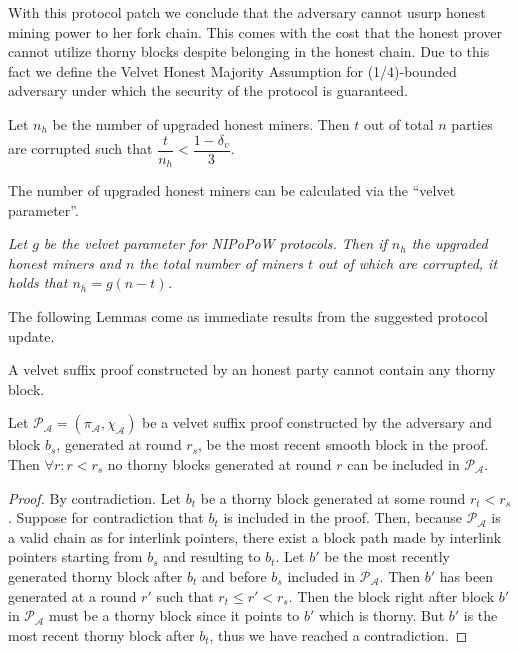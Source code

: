 With this protocol patch we conclude that the adversary cannot usurp honest mining power to her fork chain. This comes with the cost that the honest prover cannot utilize thorny blocks despite belonging in the honest chain. Due to this fact we define the Velvet Honest Majority Assumption for (1/4)-bounded adversary under which the security of the protocol is guaranteed.

\begin{definition}
	Let $n_h$ be the number of upgraded honest miners. Then $t$ out of total $n$ parties are corrupted such that $\dfrac{t}{n_h} < \dfrac{1 - \delta_v}{3} $.
	\label{defn:velvet_honest_majority}
\end{definition}

The number of upgraded honest miners can be calculated via the ``velvet parameter''.

\begin{defn}
	\textit{Let $g$ be the velvet parameter for NIPoPoW protocols.  Then if $n_h$ the upgraded honest miners and $n$ the total number of miners $t$ out of which are corrupted, it holds that $n_h = g (n - t)$.}
	\label{defn:velvet_honest_majority}
\end{defn}

The following Lemmas come as immediate results from the suggested protocol
update.

\begin{lemma}
	A velvet suffix proof constructed by an honest party cannot contain any thorny block.
	\label{lemm:smooth_honest_suffix}
\end{lemma}

\begin{lemma}
	Let $\mathcal{P_A} = (\pi_\mathcal{A}, \chi_\mathcal{A})$ be a velvet suffix proof constructed by the adversary and block $b_s$, generated at round $r_s$, be the most recent smooth block in the proof. Then $\forall r:r < r_s$ no thorny blocks generated at round $r$ can be included in $\mathcal{P_A}$.
	\label{lemm:smooths_before_smooth}
\end{lemma}
\begin{proof}
By contradiction. Let $b_t$ be a thorny block generated at some round $r_t < r_s$. Suppose for contradiction that $b_t$ is included in the proof. Then, because $\mathcal{P_A}$ is a valid chain as for interlink pointers, there exist a block path made by interlink pointers starting from $b_s$ and resulting to $b_t$. Let $b'$ be the most recently generated thorny block after $b_t$ and before $b_s$ included in $\mathcal{P_A}$. Then $b'$ has been generated at a round $r'$ such that $r_t \leq r' < r_s$. Then the block right after block $b'$ in $\mathcal{P_A}$ must be a thorny block since it points to $b'$ which is thorny. But $b'$ is the most recent thorny block after $b_t$, thus we have reached a contradiction.
\end{proof}

